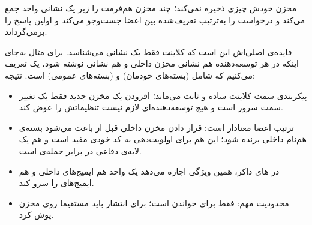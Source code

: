 مخزن  خودش چیزی ذخیره نمی‌کند؛ چند مخزن {هم‌فرمت} را زیر {یک نشانی واحد} جمع می‌کند و درخواست را به‌ترتیب تعریف‌شده بین اعضا جست‌وجو می‌کند و اولین پاسخ را برمی‌گرداند.

فایده‌ی اصلی‌اش این است که کلاینت فقط {یک} نشانی می‌شناسد. برای مثال به‌جای اینکه در  هر توسعه‌دهنده هم نشانی مخزن داخلی و هم نشانی  نوشته شود، یک  تعریف می‌کنیم که شامل  (بسته‌های خودمان) و  (بسته‌های عمومی) است. نتیجه:

\begin{itemize}
	\item پیکربندی سمت کلاینت ساده و ثابت می‌ماند؛ افزودن یک مخزن جدید فقط یک تغییر سمت سرور است و هیچ توسعه‌دهنده‌ای لازم نیست تنظیماتش را عوض کند.
	\item ترتیب اعضا معنادار است: قرار دادن مخزن داخلی {قبل} از  باعث می‌شود بسته‌ی هم‌نام داخلی برنده شود؛ این هم برای اولویت‌دهی به کد خودی مفید است و هم یک لایه‌ی دفاعی در برابر حمله‌ی  است.
	\item در های داکر، همین ویژگی اجازه می‌دهد یک  واحد هم ایمیج‌های داخلی و هم ایمیج‌های  را سرو کند.
	\item محدودیت مهم:  فقط برای {خواندن} است؛ برای انتشار باید مستقیما روی مخزن  پوش کرد.
\end{itemize}
